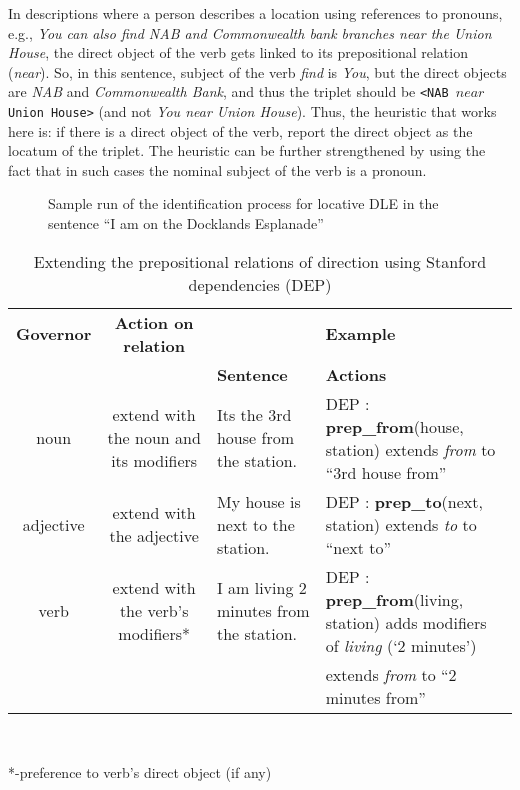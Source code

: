 \documentclass{sig-alternate}
\begin{document}
In descriptions where a person describes a location using references to pronouns, e.g., \textit{You can also find NAB and Commonwealth bank branches near the Union House}, the direct object of the verb gets linked to its prepositional relation (\textit{near}). So, in this sentence, subject of the verb \textit{find} is \textit{You}, but the direct objects are \textit{NAB} and \textit{Commonwealth Bank}, and thus the triplet should be \texttt{<NAB $near$ Union House>} (and not \textit{You near Union House}). Thus, the heuristic that works here is: if there is a direct object of the verb, report the direct object as the locatum of the triplet. The heuristic can be further strengthened by using the fact that in such cases the nominal subject of the verb is a pronoun.
\begin{figure}
\centering
\caption{Sample run of the identification process for locative DLE in the sentence  ``I am on the Docklands Esplanade''}
\label{fig:phase1}
\end{figure}
\begin{table*}
\centering
\caption{Extending the prepositional relations of direction using Stanford dependencies (DEP)}
\begin{tabular}{|c|c|p{4cm}|p{5cm}|} \hline
\textbf{Governor}&\textbf{Action on relation}&\multicolumn{2}{|c|}{\textbf{Example}} \\ \cline{3-4}
&&\textbf{Sentence}&\textbf{Actions}\\ \hline
noun & extend with the noun and its modifiers&Its the 3rd house from the station.&DEP : \textbf{prep\_from}(house, station)
extends \textit{from} to ``3rd house from'' \\ \hline
adjective & extend with the adjective&My house is next to the station.&DEP : {\textbf{prep\_to}}(next, station)
extends \textit{to} to ``next to''\\ \hline
verb & extend with the verb's modifiers*&I am living 2 minutes from the station.&DEP : \textbf{prep\_from}(living, station)
adds modifiers of \textit{living} (`2 minutes')
\\&&& 
extends \textit{from} to ``2 minutes from''\\
\hline\end{tabular}
\\ \begin{flushleft}
*-preference to verb's direct object (if any)
\end{flushleft}
\label{table:partial}
\end{table*}
\end{document}
